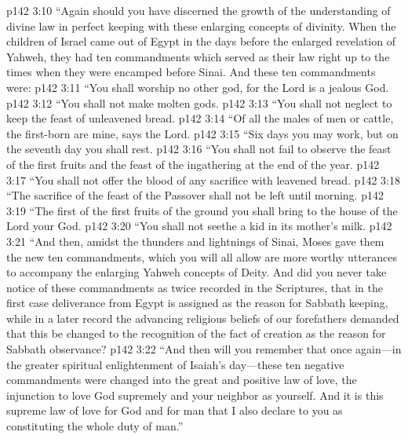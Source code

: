 \vs p142 3:10 \textcolor{ubdarkred}{“Again should you have discerned the growth of the understanding of divine law in perfect keeping with these enlarging concepts of divinity. When the children of Israel came out of Egypt in the days before the enlarged revelation of Yahweh, they had ten commandments which served as their law right up to the times when they were encamped before Sinai. And these ten commandments were:}
\pc \vs p142 3:11 \textcolor{ubdarkred}{“\bibnobreakspace You shall worship no other god, for the Lord is a jealous God.}
\vs p142 3:12 \textcolor{ubdarkred}{“\bibnobreakspace You shall not make molten gods.}
\vs p142 3:13 \textcolor{ubdarkred}{“\bibnobreakspace You shall not neglect to keep the feast of unleavened bread.}
\vs p142 3:14 \textcolor{ubdarkred}{“\bibnobreakspace Of all the males of men or cattle, the first\hyp{}born are mine, says the Lord.}
\vs p142 3:15 \textcolor{ubdarkred}{“\bibnobreakspace Six days you may work, but on the seventh day you shall rest.}
\vs p142 3:16 \textcolor{ubdarkred}{“\bibnobreakspace You shall not fail to observe the feast of the first fruits and the feast of the ingathering at the end of the year.}
\vs p142 3:17 \textcolor{ubdarkred}{“\bibnobreakspace You shall not offer the blood of any sacrifice with leavened bread.}
\vs p142 3:18 \textcolor{ubdarkred}{“\bibnobreakspace The sacrifice of the feast of the Passover shall not be left until morning.}
\vs p142 3:19 \textcolor{ubdarkred}{“\bibnobreakspace The first of the first fruits of the ground you shall bring to the house of the Lord your God.}
\vs p142 3:20 \textcolor{ubdarkred}{“\bibnobreakspace You shall not seethe a kid in its mother’s milk.}
\pc \vs p142 3:21 \textcolor{ubdarkred}{“And then, amidst the thunders and lightnings of Sinai, Moses gave them the new ten commandments, which you will all allow are more worthy utterances to accompany the enlarging Yahweh concepts of Deity. And did you never take notice of these commandments as twice recorded in the Scriptures, that in the first case deliverance from Egypt is assigned as the reason for Sabbath keeping, while in a later record the advancing religious beliefs of our forefathers demanded that this be changed to the recognition of the fact of creation as the reason for Sabbath observance?}\plusone
\vs p142 3:22 \textcolor{ubdarkred}{“And then will you remember that once again---in the greater spiritual enlightenment of Isaiah’s day---these ten negative commandments were changed into the great and positive law of love, the injunction to love God supremely and your neighbor as yourself. And it is this supreme law of love for God and for man that I also declare to you as constituting the whole duty of man.”}\plusone
